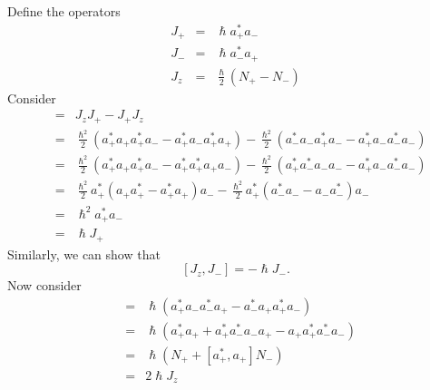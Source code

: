 \documentclass{article}
\numberwithin{equation}{section}
\theoremstyle{plain}
\numberwithin{thm}{section}
\theoremstyle{plain}
\numberwithin{prop}{section}
\theoremstyle{definition}
\numberwithin{defn}{section}
\theoremstyle{remark}
\begin{document}
Define the operators
\begin{eqnarray}
J_+ &=& \hslash a_+^\ast a_- \label{s12e18} \\
J_- &=& \hslash a_-^\ast a_+ \label{s12e19} \\
J_z &=& \frac{\hslash}{2}(N_+ - N_-) \label{s12e20}
\end{eqnarray}
Consider
\begin{eqnarray}
[J_z, J_+] &=& J_zJ_+ - J_+J_z \nonumber \\
 &=& \frac{\hslash^2}{2}(a_+^\ast a_+ a_+^\ast a_- - a_+^\ast a_- a_+^\ast a_+)
 - \frac{\hslash^2}{2}(a_-^\ast a_- a_+^\ast a_- - a_+^\ast a_- a_-^\ast a_-)
 \nonumber 	\\
 &=& \frac{\hslash^2}{2}(a_+^\ast a_+ a_+^\ast a_- - a_+^\ast a_+^\ast a_+a_-)
  - \frac{\hslash^2}{2}(a_+^\ast a_-^\ast a_- a_- - a_+^\ast a_- a_-^\ast a_-)
 \nonumber 	\\
 &=& \frac{\hslash^2}{2}a_+^\ast(a_+ a_+^\ast - a_+^\ast a_+)a_- - 
 \frac{\hslash^2}{2}a_+^\ast(a_-^\ast a_- - a_-a_-^\ast)a_- \nonumber \\
 &=& \hslash^2 a_+^\ast a_- \nonumber \\
 &=& \hslash J_+ \label{s12e21}
\end{eqnarray}
Similarly, we can show that
\begin{equation}\label{s12e22}
[J_z, J_-] = -\hslash J_-.
\end{equation}
Now consider
\begin{eqnarray}
[J_+, J_-] &=& \hslash(a_+^\ast a_- a_-^\ast a_+ - a_-^\ast a_+ a_+^\ast a_-)
	\nonumber \\
&=&\hslash(a_+^\ast a_+ + a_+^\ast a_-^\ast a_- a_+ - a_+ a_+^\ast a_-^\ast a_-)
 \nonumber \\
&=&\hslash(N_+ + [a_+^\ast, a_+]N_-) \nonumber \\
&=& 2\hslash J_z \label{s12e23}
\end{eqnarray}
\end{document}
